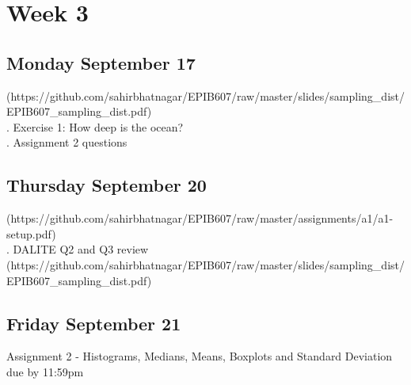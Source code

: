 \documentclass[]{book}
\let\originaltabular\tabular
\let\endoriginaltabular\endtabular
\renewenvironment{tabular}[1]{%
  \begingroup%
  \centering%
  \originaltabular{#1}}%
  {\endoriginaltabular\endgroup}
\theoremstyle{definition}
\theoremstyle{definition}
\theoremstyle{definition}
\theoremstyle{remark}
\begin{document}
\section{Week 3}\label{week-3}

\subsection{Monday September 17}\label{monday-september-17}

\begin{table}[H]
\centering
\begin{tabular}{l}
(https://github.com/sahirbhatnagar/EPIB607/raw/master/slides/sampling\_dist/EPIB607\_sampling\_dist.pdf)\\
. Exercise 1: How deep is the ocean?\\
. Assignment 2 questions\\
\hline
\end{tabular}
\end{table}

\subsection{Thursday September 20}\label{thursday-september-20}

\begin{table}[H]
\centering
\begin{tabular}{l}
(https://github.com/sahirbhatnagar/EPIB607/raw/master/assignments/a1/a1-setup.pdf)\\
. DALITE Q2 and Q3 review\\
(https://github.com/sahirbhatnagar/EPIB607/raw/master/slides/sampling\_dist/EPIB607\_sampling\_dist.pdf)\\
\hline
\end{tabular}
\end{table}

\subsection{Friday September 21}\label{friday-september-21}

\begin{table}[H]
\centering
\begin{tabular}{l}
\hline
Assignment 2 - Histograms, Medians, Means, Boxplots and Standard Deviation due by 11:59pm\\
\hline
\end{tabular}
\end{table}
\end{document}
